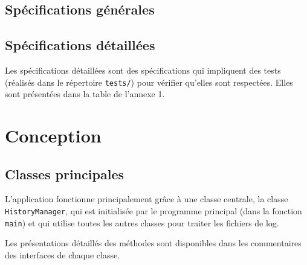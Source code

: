 \documentclass[11pt,a4paper]{article}
\begin{document}
\subsection{Spécifications générales}

\subsection{Spécifications détaillées}

Les spécifications détaillées sont des spécifications qui impliquent des tests (réalisés dans le répertoire \texttt{tests/}) pour vérifier qu'elles sont respectées. Elles sont présentées dans la table de l'annexe 1.

\section{Conception}

\subsection{Classes principales}

L'application fonctionne principalement grâce à une classe centrale, la classe \texttt{HistoryManager}, qui est initialisée par le programme principal (dans la fonction \texttt{main}) et qui utilise toutes les autres classes pour traiter les fichiers de log.

Les présentations détaillés des méthodes sont disponibles dans les commentaires des interfaces de chaque classe.
\end{document}
